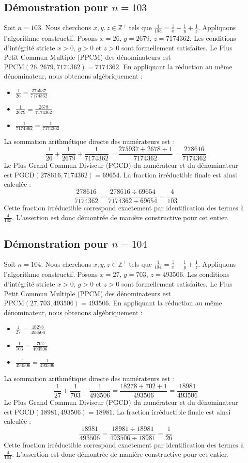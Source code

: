 \documentclass[11pt,a4paper]{article}
\begin{document}
\subsection{Démonstration pour $n = 103$}
Soit $n = 103$. Nous cherchons $x, y, z \in \mathbb{Z}^{+}$ tels que $\frac{4}{103} = \frac{1}{x} + \frac{1}{y} + \frac{1}{z}$.
Appliquons l'algorithme constructif. Posons $x = 26$, $y = 2679$, $z = 7174362$.
Les conditions d'intégrité stricte $x > 0$, $y > 0$ et $z > 0$ sont formellement satisfaites.
Le Plus Petit Commun Multiple (PPCM) des dénominateurs est $\text{PPCM}(26, 2679, 7174362) = 7174362$.
En appliquant la réduction au même dénominateur, nous obtenons algébriquement :
\begin{itemize}
    \item $\frac{1}{26} = \frac{275937}{7174362}$
    \item $\frac{1}{2679} = \frac{2678}{7174362}$
    \item $\frac{1}{7174362} = \frac{1}{7174362}$
\end{itemize}
La sommation arithmétique directe des numérateurs est :
$$ \frac{1}{26} + \frac{1}{2679} + \frac{1}{7174362} = \frac{275937 + 2678 + 1}{7174362} = \frac{278616}{7174362} $$
Le Plus Grand Commun Diviseur (PGCD) du numérateur et du dénominateur est $\text{PGCD}(278616, 7174362) = 69654$.
La fraction irréductible finale est ainsi calculée :
$$ \frac{278616}{7174362} = \frac{278616 \div 69654}{7174362 \div 69654} = \frac{4}{103} $$
Cette fraction irréductible correspond exactement par identification des termes à $\frac{4}{103}$. L'assertion est donc démontrée de manière constructive pour cet entier.

\subsection{Démonstration pour $n = 104$}
Soit $n = 104$. Nous cherchons $x, y, z \in \mathbb{Z}^{+}$ tels que $\frac{4}{104} = \frac{1}{x} + \frac{1}{y} + \frac{1}{z}$.
Appliquons l'algorithme constructif. Posons $x = 27$, $y = 703$, $z = 493506$.
Les conditions d'intégrité stricte $x > 0$, $y > 0$ et $z > 0$ sont formellement satisfaites.
Le Plus Petit Commun Multiple (PPCM) des dénominateurs est $\text{PPCM}(27, 703, 493506) = 493506$.
En appliquant la réduction au même dénominateur, nous obtenons algébriquement :
\begin{itemize}
    \item $\frac{1}{27} = \frac{18278}{493506}$
    \item $\frac{1}{703} = \frac{702}{493506}$
    \item $\frac{1}{493506} = \frac{1}{493506}$
\end{itemize}
La sommation arithmétique directe des numérateurs est :
$$ \frac{1}{27} + \frac{1}{703} + \frac{1}{493506} = \frac{18278 + 702 + 1}{493506} = \frac{18981}{493506} $$
Le Plus Grand Commun Diviseur (PGCD) du numérateur et du dénominateur est $\text{PGCD}(18981, 493506) = 18981$.
La fraction irréductible finale est ainsi calculée :
$$ \frac{18981}{493506} = \frac{18981 \div 18981}{493506 \div 18981} = \frac{1}{26} $$
Cette fraction irréductible correspond exactement par identification des termes à $\frac{4}{104}$. L'assertion est donc démontrée de manière constructive pour cet entier.
\end{document}
